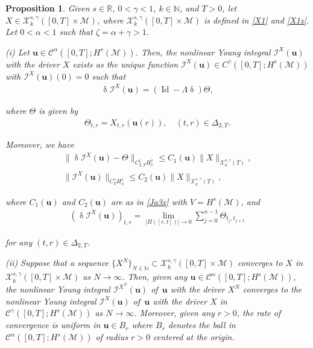 \documentclass[letterpaper, 11pt,  reqno]{amsart}
\newtheorem{proposition}[theorem]{Proposition}
\DeclareMathOperator{\Id}{Id}
\newcommand{\1}{\hspace{0.5mm}\text{I}\hspace{0.5mm}}
\newcommand{\I}{\mathcal{I}}
\newcommand{\noi}{\noindent}
\newcommand{\R}{\mathbb{R}}
\newcommand{\CC}{\mathcal{C}}
\newcommand{\al}{\alpha}
\newcommand{\updl}{\updelta}
\newcommand{\Dl}{\Delta}
\newcommand{\g}{\gamma}
\newcommand{\M}{\mathcal{M}}
\newcommand{\N}{\mathbb{N}}
\newcommand{\cX}{\mathcal{X}}
\newcommand{\uu}{\mathbf{u}}
\newcommand{\z}{\zeta}
\newcommand{\Ta}{\Theta}
\numberwithin{equation}{section}
\numberwithin{theorem}{section}
\begin{document}
\begin{proposition}\label{PROP:young1}
Given   $s \in \R$, $0 < \g < 1$,  $k \in \N$, and $T >0$, 
let   $X \in \cX^{s, \g}_k([0, T]\times \M)$, 
where $ \cX^{s, \g}_k([0, T]\times \M)$ is  defined  in \eqref{X1}
and \eqref{X1z}.
Let
$0 < \al < 1$
such that 
 $\z  = \al + \g > 1$.





\smallskip

\noi
\textup{(i)}
Let  
  $\uu \in \CC^{\al}([0,T];H^s(\M))$.
 Then, the nonlinear Young integral $\I^X(\uu)$
 with the driver $X$ exists
 as the unique function  
$\I^X(\uu)\in C^\g([0,T]; H^s(\M))$
 with $\I^X(\uu)(0) = 0$
 such that 
 \begin{align}
\updl \I^X(\uu) = (\Id - \Lambda \updl)\Theta, 
\label{Y1}
\end{align}

 
\noi
where $\Ta$ is given by   
\begin{align*}
\Theta_{t,r} = X_{t,r}(\uu(r)), \quad (t,r)\in \Dl_{2,T}.
\end{align*}

\noi
Moreover, we have
\begin{align}
\label{Y2}
\|\updl \I^X(\uu) - \Theta\|_{C^\z_{2,T} H^s_x}
\le
C_1(\uu)\|X\|_{\cX^{s, \g}_k(T)},\\
\label{Y3}
\|\I^X(\uu)\|_{C^\g_T  H^s_x} 
\le
C_2(\uu)\|X\|_{\cX^{s, \g}_k(T)}, 
\end{align}


\noi
where $C_1(\uu)$ and $C_2(\uu)$ are as in \eqref{Ja3x}
with $V = H^s(\M)$, 
and 
\begin{align*}
(\updl \I^X(\uu))_{t,r} = \lim_{|\Pi([r,t])|\to 0} 
\sum^{n-1}_{j=0} \Theta_{t_j,t_{j+1}}
\end{align*} 


\noi
for any  $(t,r)\in \Dl_{2,T}$.


\smallskip

\noi
\textup{(ii)}
Suppose that a sequence $\{X^N\}_{N \in \N}\subset 
 \cX^{s, \g}_k([0, T]\times \M)$
 converges to $X$ in 
 $ \cX^{s, \g}_k([0, T]\times \M)$ as $N \to \infty$.
Then, given
any  $\uu \in \CC^{\al}([0,T];H^s(\M))$, 
 the nonlinear Young integral $\I^{X^N}(\uu)$
 of~$\uu$ 
 with the driver $X^N$ 
 converges to 
 the nonlinear Young integral $\I^X(\uu)$
 of~$\uu$ 
 with the driver $X$ 
 in $\CC^\g([0, T]; H^s(\M))$
as $N \to \infty$.
Moreover, 
given any $r > 0$, 
the rate of convergence is
uniform in $\uu \in B_r$ 
where
$B_r$ denotes the ball 
in $\CC^{\al}([0,T];H^s(\M))$
of radius $r > 0$ centered at the origin.


\end{proposition}
\end{document}
